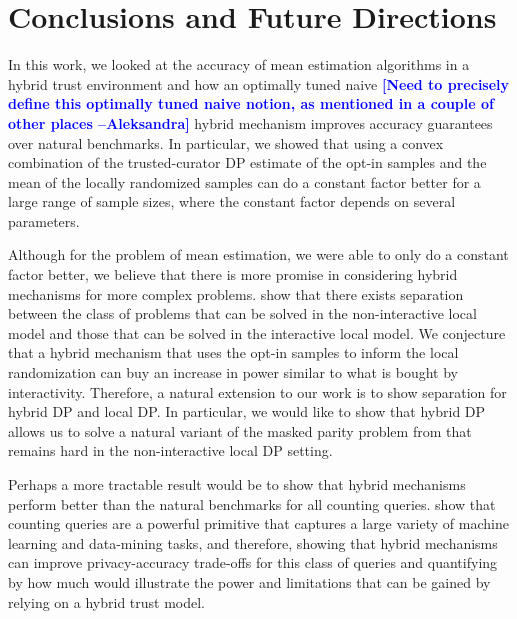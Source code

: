 \documentclass{article}
\newcommand{\ak}[1]{\textcolor{blue}{\bf\small [#1 --Aleksandra]}}
\theoremstyle{plain}
\begin{document}
\section{Conclusions and Future Directions}
In this work, we looked at the accuracy of mean estimation algorithms in a hybrid trust environment and how an optimally tuned naive \ak{Need to precisely define this optimally tuned naive notion, as mentioned in a couple of other places} hybrid mechanism improves accuracy guarantees over natural benchmarks. In particular, we showed that using a convex combination of the trusted-curator DP estimate of the opt-in samples and the mean of the locally randomized samples can do a constant factor better for a large range of sample sizes, where the constant factor depends on several parameters.

Although for the problem of mean estimation, we were able to only do a constant factor better, we believe that there is more promise in considering hybrid mechanisms for more complex problems. \cite{Kasiviswanathan:2011:WLP:2078965.2078976} show that there exists separation between the class of problems that can be solved in the non-interactive local model and those that can be solved in the interactive local model. We conjecture that a hybrid mechanism that uses the opt-in samples to inform the local randomization can buy an increase in power similar to what is bought by interactivity. Therefore, a natural extension to our work is to show separation for hybrid DP and local DP. In particular, we would like to show that hybrid DP allows us to solve a natural variant of the masked parity problem from \cite{Kasiviswanathan:2011:WLP:2078965.2078976} that remains hard in the non-interactive local DP setting.

Perhaps a more tractable result would be to show that hybrid mechanisms perform better than the natural benchmarks for all counting queries. \cite{Blum:2005:PPS:1065167.1065184} show that counting queries are a powerful primitive that captures a large variety of machine learning and data-mining tasks, and therefore, showing that hybrid mechanisms can improve privacy-accuracy trade-offs for this class of queries and quantifying by how much would illustrate the power and limitations that can be gained by relying on a hybrid trust model. 

\small


\end{document}
